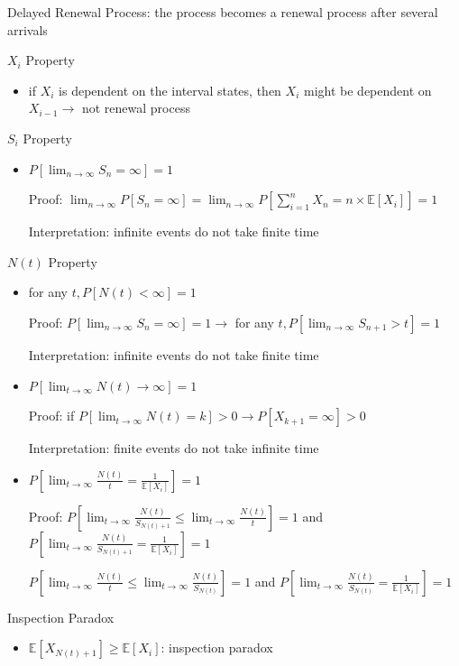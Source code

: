 \documentclass[a4paper]{article}
\begin{document}
\begin{itemize}
\begin{itemize}
                Delayed Renewal Process: the process becomes a renewal process after several arrivals

                $X_i$ Property
                \begin{itemize}
                    \item if $X_i$ is dependent on the interval states, then $X_i$ might be dependent on $X_{i-1} \rightarrow$ not renewal process
                \end{itemize}
                $S_i$ Property
                \begin{itemize}
                    \item $P[\lim_{n \rightarrow \infty} S_n = \infty] = 1$

                        Proof: $\lim_{n \rightarrow \infty} P[S_n = \infty] = \lim_{n \rightarrow \infty} P[\sum_{i = 1}^n X_n = n \times \mathbb{E}[X_i]] = 1$

                        Interpretation: infinite events do not take finite time
                \end{itemize}
                $N(t)$ Property
                \begin{itemize}
                    \item for any $t, P[N(t) < \infty] = 1$

                        Proof: $P[\lim_{n \rightarrow \infty} S_n = \infty] = 1 \rightarrow$ for any $t, P[\lim_{n \rightarrow \infty} S_{n+1} > t] = 1$

                        Interpretation: infinite events do not take finite time
                    \item $P[\lim_{t \rightarrow \infty} N(t) \rightarrow \infty] = 1$

                        Proof: if $P[\lim_{t \rightarrow \infty} N(t) = k] > 0 \rightarrow P[X_{k+1} = \infty] > 0$

                        Interpretation: finite events do not take infinite time
                    \item $P[\lim_{t \rightarrow \infty} \frac{N(t)}{t} = \frac{1}{\mathbb{E}[X_i]}] = 1$

                        Proof: $P[\lim_{t \rightarrow \infty} \frac{N(t)}{S_{N(t) + 1}} \leq \lim_{t \rightarrow \infty} \frac{N(t)}{t}] = 1$ and $P[\lim_{t \rightarrow \infty} \frac{N(t)}{S_{N(t) + 1}} = \frac{1}{\mathbb{E}[X_i]}] = 1$

                        $P[\lim_{t \rightarrow \infty} \frac{N(t)}{t} \leq \lim_{t \rightarrow \infty} \frac{N(t)}{S_{N(t)}}] = 1$ and $P[\lim_{t \rightarrow \infty} \frac{N(t)}{S_{N(t)}} = \frac{1}{\mathbb{E}[X_i]}] = 1$
                \end{itemize}
                Inspection Paradox
                \begin{itemize}
                    \item $\mathbb{E}[X_{N(t) + 1}] \geq \mathbb{E}[X_i]$: inspection paradox


\end{itemize}
\end{itemize}
\end{itemize}
\end{document}
